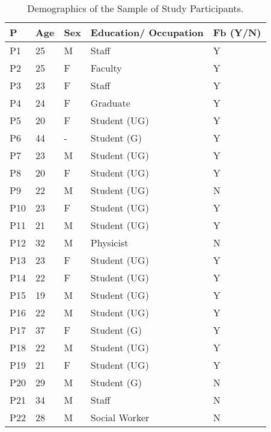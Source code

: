 \begin{table}[!htb]
   
      \centering
        \begin{tabular}{ |p{1cm}||p{1cm}|p{1cm}|p{2.5cm}|p{1cm}|}
\hline
 P & Age & Sex & Education/ Occupation & Fb (Y/N)\\
 \hline
 P1&25&M&Staff&Y\\
 P2&25&F&Faculty&Y\\
 P3&23&F&Staff&Y\\
 P4&24&F&Graduate&Y\\
 P5&20&F&Student (UG)&Y\\
 P6&44&-&Student (G)&Y\\
 P7&23&M&Student (UG)&Y\\ 
 P8&20&F&Student (UG)&Y\\
 P9&22&M&Student (UG)&N\\
 P10&23&F&Student (UG)&Y\\
 P11&21&M&Student (UG)&Y\\
 P12&32&M&Physicist&N\\ 
 P13&23&F&Student (UG)&Y\\ 
 P14&22&F&Student (UG)&Y\\
 P15&19&M&Student (UG)&Y\\ 
 P16&22&M&Student (UG)&Y\\ 
 P17&37&F&Student (G)&Y\\ 
 P18&22&M&Student (UG)&Y\\
 P19&21&F&Student (UG)&Y\\ 
 P20&29&M&Student (G)&N\\
 P21&34&M&Staff&N\\
 P22&28&M&Social Worker&N\\ 
\hline
\end{tabular}
    \caption{Demographics of the Sample of Study Participants.}
 \label{tab:participants}
  \vspace{-5mm}
\end{table}

